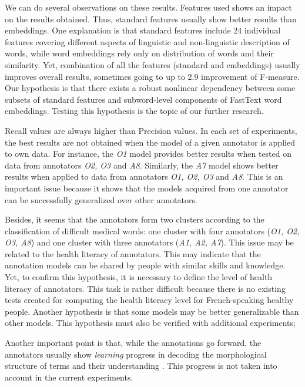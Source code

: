 We can do several observations on these results.
Features used shows an impact on the results obtained. Thus, standard
features usually show better results than embeddings. One explanation
is that standard features include 24 individual features covering
different aspects of linguistic and non-linguistic description of
words, while word embeddings rely only on distribution of words and
their similarity. Yet, combination of all the features (standard and
embeddings) usually improves overall results, sometimes going to up to
2.9 improvement of F-measure.  Our hypothesis is that there exists a
robust nonlinear dependency between some subsets of standard features
and subword-level components of FastText word embeddings. Testing this
hypothesis is the topic of our further research.

Recall values are always higher than Precision values.
In each set of experiments, the best results are not obtained when the
model of a given annotator is applied to own data. For instance, the
{\it O1} model provides better results when tested on data from
annotators {\it O2, O3} and {\it A8}.  Similarly, the {\it A7} model
shows better results when applied to data from annotators {\it O1, O2,
  O3} and {\it A8}. This is an important issue because it shows that
the models acquired from one annotator can be successfully generalized
over other annotators.

Besides, it seems that the annotators form two clusters according to
the classification of difficult medical words: one cluster with four
annotators ({\it O1, O2, O3, A8}) and one cluster with three
annotators ({\it A1, A2, A7}). This issue may be related to the health
literacy of annotators. This may indicate that the annotation models
can be shared by people with similar skills and knowledge. Yet, to
confirm this hypothesis, it is necessary to define the level of health
literacy of annotators. This task is rather difficult because there is
no existing tests created for computing the health literacy level for
French-speaking healthy people. Another hypothesis is that some models
may be better generalizable than other models. This hypothesis must
also be verified with additional experiments;

Another important point is that, while the annotations go forward, the
annotators usually show {\it learning} progress in decoding the
morphological structure of terms and their understanding
\citep{Grabar-BIONLP2017}. This progress is not taken into account in
the current experiments.